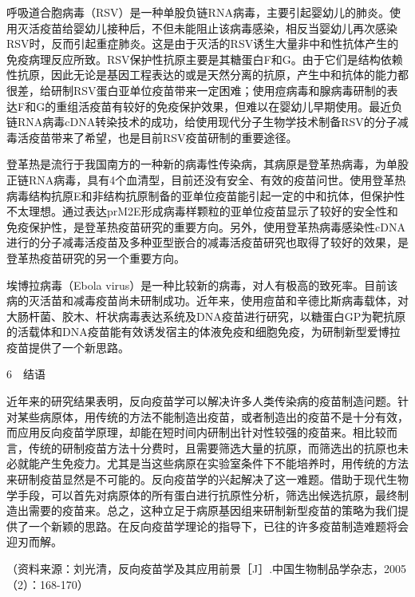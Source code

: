 呼吸道合胞病毒（RSV）是一种单股负链RNA病毒，主要引起婴幼儿的肺炎。使用灭活疫苗给婴幼儿接种后，不但未能阻止该病毒感染，相反当婴幼儿再次感染RSV时，反而引起重症肺炎。这是由于灭活的RSV诱生大量非中和性抗体产生的免疫病理反应所致。RSV保护性抗原主要是其糖蛋白F和G。由于它们是结构依赖性抗原，因此无论是基因工程表达的或是天然分离的抗原，产生中和抗体的能力都很差，给研制RSV蛋白亚单位疫苗带来一定困难；使用痘病毒和腺病毒研制的表达F和G的重组活疫苗有较好的免疫保护效果，但难以在婴幼儿早期使用。最近负链RNA病毒cDNA转染技术的成功，给使用现代分子生物学技术制备RSV的分子减毒活疫苗带来了希望，也是目前RSV疫苗研制的重要途径。

登革热是流行于我国南方的一种新的病毒性传染病，其病原是登革热病毒，为单股正链RNA病毒，具有4个血清型，目前还没有安全、有效的疫苗问世。使用登革热病毒结构抗原E和非结构抗原制备的亚单位疫苗能引起一定的中和抗体，但保护性不太理想。通过表达prM2E形成病毒样颗粒的亚单位疫苗显示了较好的安全性和免疫保护性，是登革热疫苗研究的重要方向。另外，使用登革热病毒感染性cDNA进行的分子减毒活疫苗及多种亚型嵌合的减毒活疫苗研究也取得了较好的效果，是登革热疫苗研究的另一个重要方向。

埃博拉病毒（Ebola
virus）是一种比较新的病毒，对人有极高的致死率。目前该病的灭活苗和减毒疫苗尚未研制成功。近年来，使用痘苗和辛德比斯病毒载体，对大肠杆菌、胶木、杆状病毒表达系统及DNA疫苗进行研究，以糖蛋白GP为靶抗原的活载体和DNA疫苗能有效诱发宿主的体液免疫和细胞免疫，为研制新型爱博拉疫苗提供了一个新思路。

6　结语

近年来的研究结果表明，反向疫苗学可以解决许多人类传染病的疫苗制造问题。针对某些病原体，用传统的方法不能制造出疫苗，或者制造出的疫苗不是十分有效，而应用反向疫苗学原理，却能在短时间内研制出针对性较强的疫苗来。相比较而言，传统的研制疫苗方法十分费时，且需要筛选大量的抗原，而筛选出的抗原也未必就能产生免疫力。尤其是当这些病原在实验室条件下不能培养时，用传统的方法来研制疫苗显然是不可能的。反向疫苗学的兴起解决了这一难题。借助于现代生物学手段，可以首先对病原体的所有蛋白进行抗原性分析，筛选出候选抗原，最终制造出需要的疫苗来。总之，这种立足于病原基因组来研制新型疫苗的策略为我们提供了一个新颖的思路。在反向疫苗学理论的指导下，已往的许多疫苗制造难题将会迎刃而解。

（资料来源：刘光清，反向疫苗学及其应用前景［J］.中国生物制品学杂志，2005（2）：168-170）